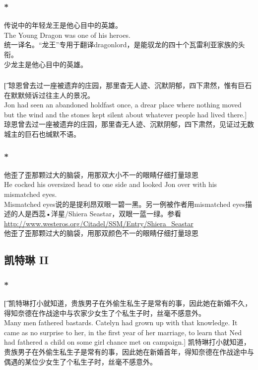 \documentclass[12pt,a4paper]{article}
\newcommand{\h}[1]{{\color{red}#1}\\}
\newcommand{\la}[1]{{\color{blue}#1}\\}
\begin{document}
\subsubsection{\color{red}*}
\la{传说中的年轻龙王是他心目中的英雄。\\
The Young Dragon was one of his heroes.}\h{
统一译名。“龙王”专用于翻译dragonlord，是能驭龙的四十个瓦雷利亚家族的头衔。}
少龙主是他心目中的英雄。

\subsubsection{}\t[
	琼恩曾去过一座被遗弃的庄园，那里杳无人迹、沉默阴郁，四下肃然，惟有巨石在默默倾诉过往主人的景况。\\
	Jon had seen an abandoned holdfast once, a drear place where nothing moved but the wind and the stones kept silent about whatever people had lived there.]
	琼恩曾去过一座被遗弃的庄园，那里杳无人迹、沉默阴郁，四下肃然，见证过无数城主的巨石也缄默不语。

\subsubsection{\color{red}*}\la{
他歪了歪那颗过大的脑袋，用那双大小不一的眼睛仔细打量琼恩\\
He cocked his oversized head to one side and looked Jon over with his mismatched eyes.}
\h{
Mismatched eyes说的是提利昂双眼一碧一黑。另一例被作者用mismatched eyes描述的人是西蕊•洋星/Shiera Seastar，双眼一蓝一绿。参看\url{http://www.westeros.org/Citadel/SSM/Entry/Shiera_Seastar}}
他歪了歪那颗过大的脑袋，用那双颜色不一的眼睛仔细打量琼恩

\subsection{凯特琳 II}

\subsubsection{\color{red}*}\t[
	凯特琳打小就知道，贵族男子在外偷生私生子是常有的事，因此她在新婚不久，得知奈德在作战途中与农家少女生了个私生子时，丝毫不感意外。\\
	Many men fathered bastards. Catelyn had grown up with that knowledge. It came as no surprise to her, in the first year of her marriage, to learn that Ned had fathered a child on some girl chance met on campaign.]
	凯特琳打小就知道，贵族男子在外偷生私生子是常有的事，因此她在新婚首年，得知奈德在作战途中与偶遇的某位少女生了个私生子时，丝毫不感意外。
\end{document}
